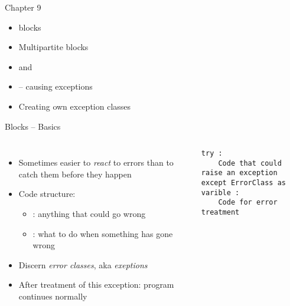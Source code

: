 
\begin{frame}[fragile]{Chapter 9}
%
\begin{itemize}
\item {} blocks
\item Multipartite  blocks
\item {} and 
\item {} -- causing exceptions
\item Creating own exception classes
\end{itemize}
%
\end{frame}


\begin{frame}[fragile]{ Blocks -- Basics}
%
\begin{columns}[T]
\begin{itemize}
\item Sometimes easier to \emph{react} to errors than to catch them before they happen
\item Code structure:
	\begin{itemize}
	\item {}: anything that could go wrong
	\item {}: what to do when something has gone wrong
	\end{itemize}
\item Discern \emph{error classes}, aka \emph{exeptions}
\item After treatment of this exception: program continues normally
\end{itemize}
%
\begin{codebox}
\begin{verbatim}
try :
    Code that could raise an exception
except ErrorClass as varible :
    Code for error treatment
\end{verbatim}
\end{codebox}
\end{columns}
%
\end{frame}


